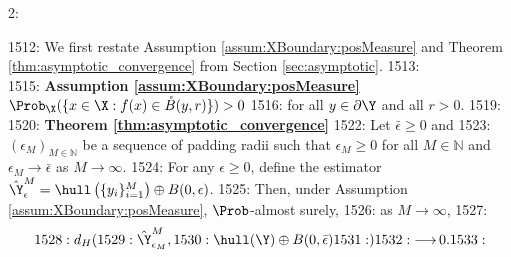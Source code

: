 2: \documentclass[12pt]{l4dc2022} %
\begin{document}
1512: We first restate Assumption \ref{assum:XBoundary:posMeasure} and Theorem \ref{thm:asymptotic_convergence} from Section \ref{sec:asymptotic}. 
1513: \\[2mm]
1515: \textbf{Assumption \ref{assum:XBoundary:posMeasure}} $\Prob_\X(\{x\in\X: f(x)\in\mathring{B}(y,r)\})>0$  
1516: for all $y\in\partial\Y$ and all $r>0$.
1519: \\[2mm]
1520: \textbf{Theorem \ref{thm:asymptotic_convergence}}
1522: Let $\bar{\epsilon}\geq 0$ and 
1523: $(\epsilon_M)_{M\in\mathbb{N}}$ be a sequence of padding radii such that $\epsilon_M\geq 0$ for all $M\in\mathbb{N}$ and $\epsilon_M\rightarrow \bar{\epsilon}$ as $M\rightarrow\infty$. 
1524: For any $\epsilon\geq 0$, define the estimator $\hat\Y^M_{\epsilon}=\hull\left(\{y_i\}_{i{=}1}^M\right)\oplus B(0,\epsilon)$.  
1525: Then, under Assumption \ref{assum:XBoundary:posMeasure}, $\Prob$-almost surely, 
1526: as $M\rightarrow\infty$, 
1527: $$
1528: d_H(
1529: \hat\Y_{\epsilon_M}^M, 
1530: \hull(\Y)\oplus B(0,\bar{\epsilon})
1531: )
1532: \mathop{\longrightarrow} 0.
1533: $$
\end{document}
